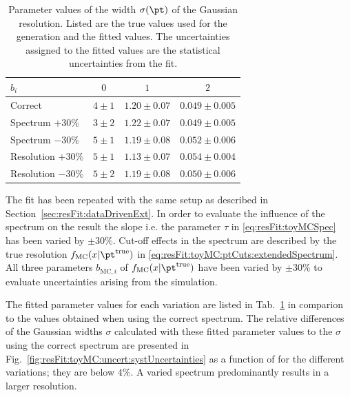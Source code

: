 \documentclass[a4paper]{cmspaper} %
\newcommand{\truth}{\ensuremath{\pt^{\text{true}}}\xspace}
\begin{document}
\begin{table}[ht]
  \centering
  \begin{tabular}[ht]{lccc}
    \hline \hline
    $b_{i}$ & $0$ & $1$ & $2$ \\
    \hline
   Correct            & $4 \pm 1$ & $1.20 \pm 0.07$ & $0.049 \pm 0.005$ \\
   Spectrum $+30\%$   & $3 \pm 2$ & $1.22 \pm 0.07$ & $0.049 \pm 0.005$ \\
   Spectrum $-30\%$   & $5 \pm 1$ & $1.19 \pm 0.08$ & $0.052 \pm 0.006$ \\
   Resolution $+30\%$ & $5 \pm 1$ & $1.13 \pm 0.07$ & $0.054 \pm 0.004$ \\
   Resolution $-30\%$ & $5 \pm 2$ & $1.19 \pm 0.08$ & $0.050 \pm 0.006$ \\
    \hline \hline
  \end{tabular}
  \caption{Parameter values of the width $\sigma(\pt)$ of the Gaussian
    resolution. Listed are the true values used for the generation and
    the fitted values. The uncertainties assigned to the fitted values
    are the statistical uncertainties from the fit.}
  \label{tab:resFit:toyMC:uncert:fitResult}
\end{table}

The fit has been repeated with the same setup as described in Section~\ref{sec:resFit:dataDrivenExt}.
In order to evaluate the influence of the spectrum on the result the slope i.e. the parameter $\tau$ in \eqref{eq:resFit:toyMCSpec} has been varied by $\pm30\%$.
Cut-off effects in the spectrum are described by the true resolution $f_{\text{MC}}(x|\truth)$ in \eqref{eq:resFit:toyMC:ptCuts:extendedSpectrum}.
All three parameters $b_{\text{MC},i}$ of $f_{\text{MC}}(x|\truth)$ have been varied by $\pm30\%$ to evaluate uncertainties arising from the simulation.

The fitted parameter values for each variation are listed in Tab.~\ref{tab:resFit:toyMC:uncert:fitResult} in comparion to the values obtained when using the correct spectrum.
The relative differences of the Gaussian widths $\sigma$ calculated with these fitted parameter values to the $\sigma$ using the correct spectrum are presented in Fig.~\ref{fig:resFit:toyMC:uncert:systUncertainties} as a function of \pt for the different variations; they are below $4\%$.
A varied spectrum predominantly results in a larger resolution.
\end{document}
